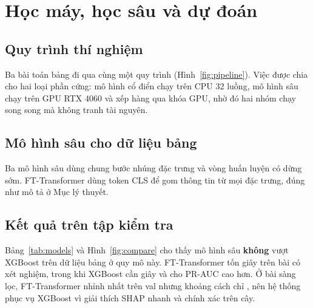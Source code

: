 \chapter{Học máy, học sâu và dự đoán}\label{chap:hocmay}

\section{Quy trình thí nghiệm}

Ba bài toán bảng đi qua cùng một quy trình (Hình~\ref{fig:pipeline}). Việc được chia cho hai loại phần cứng: mô hình cổ điển chạy trên CPU 32 luồng, mô hình sâu chạy trên GPU RTX 4060 và xếp hàng qua khóa GPU, nhờ đó hai nhóm chạy song song mà không tranh tài nguyên.


\section{Mô hình sâu cho dữ liệu bảng}

Ba mô hình sâu dùng chung bước nhúng đặc trưng và vòng huấn luyện có dừng sớm. FT-Transformer dùng token CLS để gom thông tin từ mọi đặc trưng, đúng như mô tả ở Mục lý thuyết.


\section{Kết quả trên tập kiểm tra}

\begin{table}[!htbp]\centering\caption{Kết quả sáu mô hình trên test của ba bài toán sau hiệu chỉnh isotonic}\label{tab:models}
\small\setlength{\tabcolsep}{3.5pt}\end{table}

Bảng~\ref{tab:models} và Hình~\ref{fig:compare} cho thấy mô hình sâu \textbf{không} vượt XGBoost trên dữ liệu bảng ở quy mô này. FT-Transformer tốn  giây trên bài có xét nghiệm, trong khi XGBoost cần  giây và cho PR-AUC cao hơn. Ở bài sàng lọc, FT-Transformer nhỉnh nhất trên val nhưng khoảng cách chỉ , nên hệ thống phục vụ XGBoost vì giải thích SHAP nhanh và chính xác trên cây.

